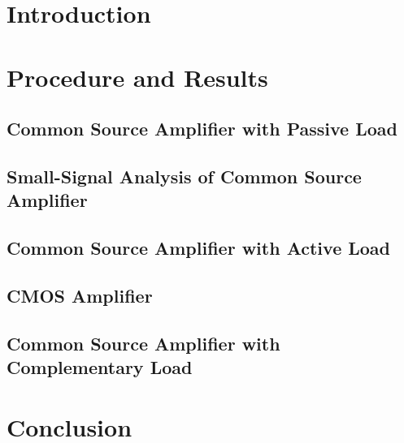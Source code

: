 \documentclass{article}
\begin{document}
\begin{titlepage}

\end{titlepage}
\section{Introduction}

\section{Procedure and Results}
\subsection{Common Source Amplifier with Passive Load}

\subsection{Small-Signal Analysis of Common Source Amplifier}

\subsection{Common Source Amplifier with Active Load}

\subsection{CMOS Amplifier}

\subsection{Common Source Amplifier with Complementary Load}

\section{Conclusion}

\end{document}
